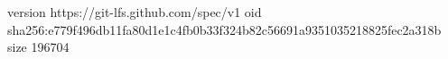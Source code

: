 version https://git-lfs.github.com/spec/v1
oid sha256:e779f496db11fa80d1e1c4fb0b33f324b82c56691a9351035218825fec2a318b
size 196704
